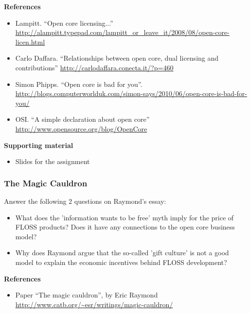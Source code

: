 \documentclass[a4paper]{article}
\begin{document}
\textbf{References}

\begin{itemize}
\item Lampitt. ``Open core licensing...''
  \footnotesize{\url{http://alampitt.typepad.com/lampitt_or_leave_it/2008/08/open-core-licen.html}}
\item Carlo Daffara. ``Relationships between open core, dual licensing and contributions''
   \url{http://carlodaffara.conecta.it/?p=460}
 \item Simon Phipps. ``Open core is bad for you''.
   \footnotesize{\url{http://blogs.computerworlduk.com/simon-says/2010/06/open-core-is-bad-for-you/}}
 \item OSI. ``A simple declaration about open core''
   \url{http://www.opensource.org/blog/OpenCore}
\end{itemize}

\textbf{Supporting material}

\begin{itemize}
\item Slides for the assignment
\end{itemize}

\subsubsection{The Magic Cauldron}
\label{sub:business-magic-cauldron}

Answer the following 2 questions on Raymond's essay:

\begin{itemize}
\item What does the 'information wants to be free' myth imply for the price of FLOSS products? Does it have any connections to the open core business model?
\item Why does Raymond argue that the so-called 'gift culture' is not a good model to explain the economic incentives behind FLOSS development?
\end{itemize}

\textbf{References}

\begin{itemize}
\item Paper ``The magic cauldron'', by Eric Raymond \\
  \url{http://www.catb.org/~esr/writings/magic-cauldron/}
\end{itemize}

\end{document}
